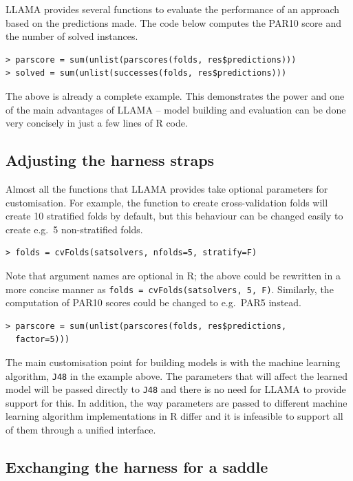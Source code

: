 \documentclass{llncs}
\begin{document}
LLAMA provides several functions to evaluate the performance of an approach
based on the predictions made. The code below computes the PAR10 score and the
number of solved instances.

\begin{verbatim}
> parscore = sum(unlist(parscores(folds, res$predictions)))
> solved = sum(unlist(successes(folds, res$predictions)))
\end{verbatim}

The above is already a complete example. This demonstrates the power and one of
the main advantages of LLAMA -- model building and evaluation can be done very
concisely in just a few lines of R code.

\subsection{Adjusting the harness straps}

Almost all the functions that LLAMA provides take optional parameters for
customisation. For example, the function to create cross-validation folds will
create 10 stratified folds by default, but this behaviour can be changed easily
to create e.g.\ 5 non-stratified folds.

\begin{verbatim}
> folds = cvFolds(satsolvers, nfolds=5, stratify=F)
\end{verbatim}

Note that argument names are optional in R; the above could be rewritten in a
more concise manner as \verb+folds = cvFolds(satsolvers, 5, F)+. Similarly, the
computation of PAR10 scores could be changed to e.g.\ PAR5 instead.

\begin{verbatim}
> parscore = sum(unlist(parscores(folds, res$predictions,
  factor=5)))
\end{verbatim}

The main customisation point for building models is with the machine learning
algorithm, \verb+J48+ in the example above. The parameters that will affect the
learned model will be passed directly to \verb+J48+ and there is no need for
LLAMA to provide support for this. In addition, the way parameters are passed to
different machine learning algorithm implementations in R differ and it is
infeasible to support all of them through a unified interface.

\subsection{Exchanging the harness for a saddle}
\end{document}

